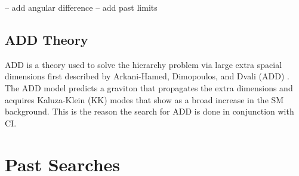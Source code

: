 -- add angular difference
-- add past limits






\subsection{ADD Theory}
ADD is a theory used to solve the hierarchy problem via large extra spacial dimensions first described by Arkani-Hamed, Dimopoulos, and Dvali (ADD) \cite{ADD}. The ADD model predicts a graviton that propagates the extra dimensions and acquires Kaluza-Klein (KK) modes that show as a broad increase in the SM background. This is the reason the search for ADD is done in conjunction with CI.




\section{Past Searches}











